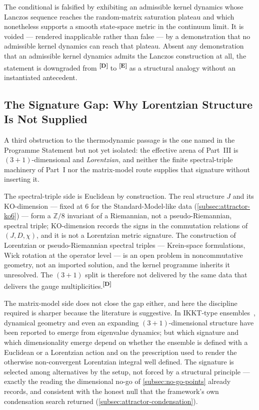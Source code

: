 \documentclass[12pt,a4paper,twoside]{article}
\theoremstyle{plain}
\theoremstyle{definition}
\theoremstyle{remark}
\newcommand{\catmark}[1]{\textsuperscript{\textsf{\textbf{[#1]}}}}
\begin{document}
\begin{killswitch}
The conditional is falsified by exhibiting an admissible kernel dynamics
whose Lanczos sequence reaches the random-matrix saturation plateau and
which nonetheless supports a smooth state-space metric in the continuum
limit. It is voided --- rendered inapplicable rather than false --- by a
demonstration that no admissible kernel dynamics can reach that plateau.
Absent any demonstration that an admissible kernel dynamics admits the
Lanczos construction at all, the statement is downgraded from \catmark{D}
to \catmark{E} as a structural analogy without an instantiated antecedent.
\end{killswitch}

\subsection{The Signature Gap: Why Lorentzian Structure Is Not Supplied}
\label{subsec:signature-gap}

A third obstruction to the thermodynamic passage is the one named in the
Programme Statement but not yet isolated: the effective arena of Part~III
is $(3{+}1)$-dimensional and \emph{Lorentzian}, and neither the finite
spectral-triple machinery of Part~I nor the matrix-model route supplies
that signature without inserting it.

The spectral-triple side is Euclidean by construction. The real structure
$J$ and its $\mathrm{KO}$-dimension --- fixed at $6$ for the
Standard-Model-like data (\cref{subsec:attractor-ko6}) --- form a
$\mathbb Z/8$ invariant of a Riemannian, not a pseudo-Riemannian, spectral
triple; $\mathrm{KO}$-dimension records the signs in the commutation
relations of $(J, D, \chi)$, and it is not a Lorentzian metric signature.
The construction of Lorentzian or pseudo-Riemannian spectral triples ---
Krein-space formulations, Wick rotation at the operator level --- is an
open problem in noncommutative geometry, not an imported solution, and the
kernel programme inherits it unresolved. The $(3{+}1)$ split is therefore
not delivered by the same data that delivers the gauge
multiplicities.\catmark{D}

The matrix-model side does not close the gap either, and here the
discipline required is sharper because the literature is suggestive. In
IKKT-type ensembles~\cite{ikkt1997,steinacker2010}, dynamical geometry and
even an expanding $(3{+}1)$-dimensional structure have been reported to
emerge from eigenvalue dynamics; but which signature and which
dimensionality emerge depend on whether the ensemble is defined with a
Euclidean or a Lorentzian action and on the prescription used to render
the otherwise non-convergent Lorentzian integral well defined. The
signature is selected among alternatives by the setup, not forced by a
structural principle --- exactly the reading the dimensional no-go of
\cref{subsec:no-go-points} already records, and consistent with the honest
null that the framework's own condensation search returned
(\cref{subsec:attractor-condensation}).
\end{document}
